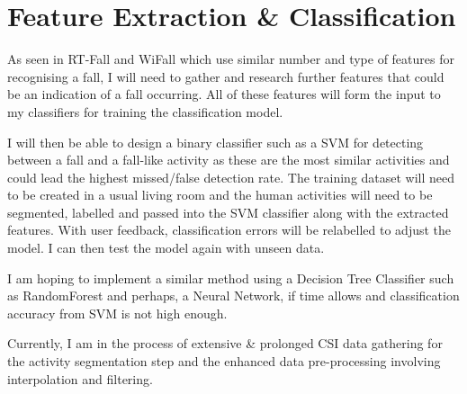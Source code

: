 \section{Feature Extraction \& Classification}
As seen in RT-Fall and WiFall which use similar number and type of features for recognising a fall, I will need to gather and research further features that could be an indication of a fall occurring. All of these features will form the input to my classifiers for training the classification model. \par
I will then be able to design a binary classifier such as a SVM for detecting between a fall and a fall-like activity as these are the most similar activities and could lead the highest missed/false detection rate. The training dataset will need to be created in a usual living room and the human activities will need to be segmented, labelled and passed into the SVM classifier along with the extracted features. With user feedback, classification errors will be relabelled to adjust the model. I can then test the model again with unseen data. \par 
I am hoping to implement a similar method using a Decision Tree Classifier such as RandomForest and perhaps, a Neural Network, if time allows and classification accuracy from SVM is not high enough. 
\begin{comment}If I have enough time, I would like to investigate if the CSI.dat files are populated in real time and if there is a possibility of creating a Real Time system out of my work. \par \end{comment}
Currently, I am in the process of extensive \& prolonged CSI data gathering for the activity segmentation step and the enhanced data pre-processing involving interpolation and filtering. 